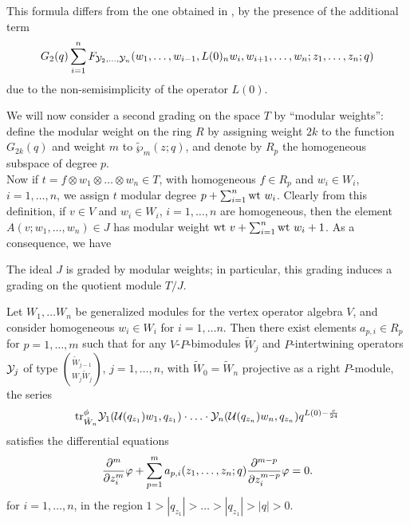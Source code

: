 \documentclass[12pt]{article}
\begin{document}
\begin{rema} {\rm
  This formula differs from the one obtained in \cite{H2}, by the presence of
  the additional term $$G_2(q)\sum_{i = 1}^n 
      F_{\mathcal{Y}_2,\ldots,\mathcal{Y}_n}
        (w_1,\ldots,w_{i-1},L(0)_n w_i, w_{i+1},\ldots ,w_n; z_1, \ldots ,z_n; q)$$
  due to the non-semisimplicity of the operator $L(0)$.
  }
\end{rema}

We will now consider a second grading on the space $T$ by ``modular weights'':
define the modular weight on the ring $R$ by assigning weight $2k$ to the
function $G_{2k}(q)$ and weight $m$ to $\tilde \wp_m(z; q)$, and denote
by $R_p$ the homogeneous subspace of degree $p$.\\
\noindent
Now if $t = f\otimes w_1\otimes\ldots\otimes w_n\in T$, with homogeneous
$f\in R_p$ and $w_i\in W_i$, $i=1,\ldots, n$, we assign $t$
modular degree $p + \sum_{i=1}^n \mbox{\rm wt}\  w_i$.
Clearly from this definition, if $v\in V$ and $w_i\in W_i$,
$i=1,\ldots,n$ are homogeneous, then the element 
$A(v;w_1,\ldots,w_n) \in J$ has modular weight
$\mbox{\rm wt}\  v + \sum_{i=1}^n \mbox{\rm wt}\  w_i + 1$. As a consequence, we have

\begin{prop}
  The ideal $J$ is graded by modular weights; in particular, this grading
  induces a grading on the quotient module $T/J$.
\end{prop}

\begin{prop}
  Let $W_1,\ldots W_n$ be generalized modules for the vertex operator algebra
  $V$, and consider homogeneous $w_i\in W_i$ for $i = 1,\ldots n$.
  Then there exist elements $a_{p,i} \in R_p$ for $p=1,\ldots, m$
  such that for any $V$-$P$-bimodules $\tilde W_j$ and $P$-intertwining operators
  $\mathcal{Y}_j$ of type $\binom{\tilde W_{j-1}}{W_j\tilde W_j}$, $j=1,\ldots,n$,
  with $\tilde W_0 = \tilde W_n$ projective as a right $P$-module,
  the series
  $$
    \mbox{\rm tr}^\phi_{\tilde W_n} \mathcal{Y}_{1}(\mathcal{U}(q_{z_{1}})w_{1}, q_{z_{1}})\cdot \ldots \cdot \mathcal{Y}_{n}(\mathcal{U}(q_{z_{n}})w_{n}, q_{z_{n}}) q^{L(0) - \frac{c}{24}}
  $$
  satisfies the differential equations
  \begin{equation}
    \frac{\partial^{m}}{\partial z_i^{m}} \varphi + \sum_{p=1}^m a_{p,i}(z_1,\ldots,z_n; q) \frac{\partial^{m-p}}{\partial z_i^{m-p}} \varphi = 0.
  \end{equation}
  for $i=1,\ldots, n$, in the region $1 > |q_{z_1}| >  \ldots > |q_{z_1}| > |q| > 0$.
\end{prop}
\end{document}
